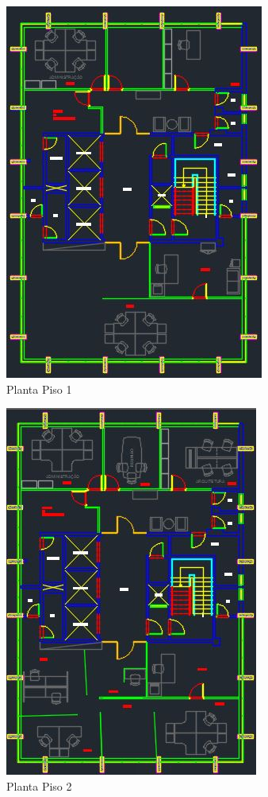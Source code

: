 \documentclass[	DIV=calc,%
							paper=a4,%
							fontsize=12pt,%
							onecolumn]{scrartcl}	 					%
\begin{document}
\begin{figure}
	\centering
	\includegraphics[]{piso1}
	\caption{Planta Piso 1}
	\label{fig1}
\end{figure}

\begin{figure}
	\centering
	\includegraphics[]{piso2}
	\caption{Planta Piso 2}
	\label{fig2}
\end{figure}
\end{document}
